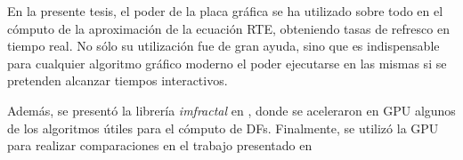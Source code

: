 En la presente tesis, el poder de la placa gráfica se ha utilizado sobre todo en el cómputo de la aproximación de la ecuación RTE, obteniendo tasas de refresco en tiempo real.
No sólo su utilización fue de gran ayuda, sino que es indispensable para cualquier algoritmo gráfico moderno el poder ejecutarse en las mismas si se pretenden alcanzar tiempos interactivos.

Además, se presentó la librería {\em imfractal} en \cite{Baravalle2013}, donde se aceleraron en GPU algunos de los algoritmos útiles para el cómputo de DFs.
Finalmente, se utilizó la GPU para realizar comparaciones en el trabajo presentado en \cite{Baravalle2014_2}

